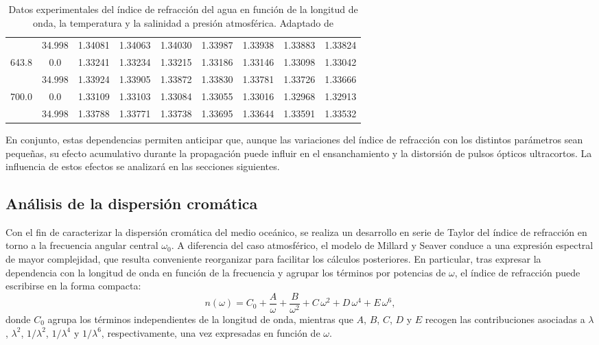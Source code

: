 \begin{table}[H]
\begin{tabular}{c c c c c c c c c}
      & 34.998 & 1.34081 & 1.34063 & 1.34030 & 1.33987 & 1.33938 & 1.33883 & 1.33824 \\
643.8 & 0.0    & 1.33241 & 1.33234 & 1.33215 & 1.33186 & 1.33146 & 1.33098 & 1.33042 \\
      & 34.998 & 1.33924 & 1.33905 & 1.33872 & 1.33830 & 1.33781 & 1.33726 & 1.33666 \\
700.0 & 0.0    & 1.33109 & 1.33103 & 1.33084 & 1.33055 & 1.33016 & 1.32968 & 1.32913 \\
      & 34.998 & 1.33788 & 1.33771 & 1.33738 & 1.33695 & 1.33644 & 1.33591 & 1.33532 \\
\hline
\end{tabular}
\caption{Datos experimentales del índice de refracción del agua en función de la longitud de onda, la temperatura y la salinidad a presión atmosférica. Adaptado de \cite{Quan}}
\label{tab:QuanTabla1}
\end{table}

En conjunto, estas dependencias permiten anticipar que, aunque las variaciones del índice de refracción con los distintos parámetros sean pequeñas, su efecto acumulativo durante la propagación puede influir en el ensanchamiento y la distorsión de pulsos ópticos ultracortos. La influencia de estos efectos se analizará en las secciones siguientes.






\subsection{Análisis de la dispersión cromática}

Con el fin de caracterizar la dispersión cromática del medio oceánico, se realiza un desarrollo en serie de Taylor del índice de refracción en torno a la frecuencia angular central $\omega_0$. A diferencia del caso atmosférico, el modelo de Millard y Seaver conduce a una expresión espectral de mayor complejidad, que resulta conveniente reorganizar para facilitar los cálculos posteriores. En particular, tras expresar la dependencia con la longitud de onda en función de la frecuencia y agrupar los términos por potencias de $\omega$, el índice de refracción puede escribirse en la forma compacta:
\begin{equation}
n(\omega)=C_{0}+\frac{A}{\omega}+\frac{B}{\omega^{2}}+C\,\omega^{2}+D\,\omega^{4}+E\,\omega^{6},
\label{eq:n_agua_compacto_taylor}
\end{equation}
donde $C_0$ agrupa los términos independientes de la longitud de onda, mientras que $A$, $B$, $C$, $D$ y $E$ recogen las contribuciones asociadas a $\lambda$, $\lambda^2$, $1/\lambda^2$, $1/\lambda^4$ y $1/\lambda^6$, respectivamente, una vez expresadas en función de $\omega$.

